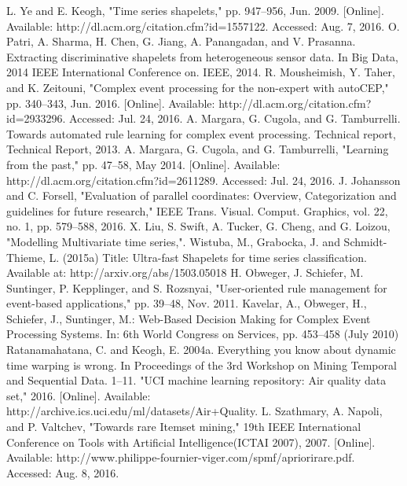 \documentclass[letterpaper, 10 pt, conference]{IEEEtran}  %
\begin{document}
\begin{thebibliography}{99}

 L. Ye and E. Keogh, "Time series shapelets," pp. 947–956, Jun. 2009. [Online]. Available: http://dl.acm.org/citation.cfm?id=1557122. Accessed: Aug. 7, 2016.
 O. Patri, A. Sharma, H. Chen, G. Jiang, A. Panangadan, and V. Prasanna. Extracting discriminative shapelets from heterogeneous sensor data. In Big Data, 2014 IEEE International Conference on. IEEE, 2014.
 R. Mousheimish, Y. Taher, and K. Zeitouni, "Complex event processing for the non-expert with autoCEP," pp. 340–343, Jun. 2016. [Online]. Available: http://dl.acm.org/citation.cfm?id=2933296. Accessed: Jul. 24, 2016.
 A. Margara, G. Cugola, and G. Tamburrelli. Towards automated rule learning for complex event processing. Technical report, Technical Report, 2013.
 A. Margara, G. Cugola, and G. Tamburrelli, "Learning from the past," pp. 47–58, May 2014. [Online]. Available: http://dl.acm.org/citation.cfm?id=2611289. Accessed: Jul. 24, 2016.
 J. Johansson and C. Forsell, "Evaluation of parallel coordinates: Overview, Categorization and guidelines for future research," IEEE Trans. Visual. Comput. Graphics, vol. 22, no. 1, pp. 579–588, 2016.
 X. Liu, S. Swift, A. Tucker, G. Cheng, and G. Loizou, "Modelling Multivariate time series,". 
 Wistuba, M., Grabocka, J. and Schmidt-Thieme, L. (2015a) Title: Ultra-fast Shapelets for time series classification. Available at: http://arxiv.org/abs/1503.05018
 H. Obweger, J. Schiefer, M. Suntinger, P. Kepplinger, and S. Rozsnyai, "User-oriented rule management for event-based applications," pp. 39–48, Nov. 2011. 
 Kavelar, A., Obweger, H., Schiefer, J., Suntinger, M.: Web-Based Decision Making for Complex Event Processing Systems. In: 6th World Congress on Services, pp. 453–458 (July 2010)
 Ratanamahatana, C. and Keogh, E. 2004a. Everything you know about dynamic time warping is wrong. In Proceedings of the 3rd Workshop on Mining Temporal and Sequential Data. 1--11.
 "UCI machine learning repository: Air quality data set," 2016. [Online]. Available: http://archive.ics.uci.edu/ml/datasets/Air+Quality.
 L. Szathmary, A. Napoli, and P. Valtchev, "Towards rare Itemset mining," 19th IEEE International Conference on Tools with Artificial Intelligence(ICTAI 2007), 2007. [Online]. Available: http://www.philippe-fournier-viger.com/spmf/apriorirare.pdf. Accessed: Aug. 8, 2016.


\end{thebibliography}
\end{document}
